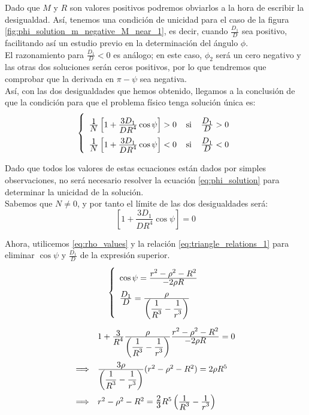 \documentclass[11pt]{book}
\newcommand\ddfrac[2]{\frac{\displaystyle #1}{\displaystyle #2}}
\begin{document}
Dado que $M$ y $R$ son valores positivos podremos obviarlos a la hora de escribir la desigualdad. Así, tenemos una condición de unicidad para el caso de la figura \ref{fig:phi_solution_m_negative_M_near_1}, es decir, cuando $\ddfrac{D_1}{D}$ sea positivo, facilitando así un estudio previo en la determinación del ángulo $\phi$.\\

El razonamiento para $\ddfrac{D_1}{D}<0$ es análogo; en este caso, $\phi_2$ será un cero negativo y las otras dos soluciones serán ceros positivos, por lo que tendremos que comprobar que la derivada en $\pi-\psi$ sea negativa.\\

Así, con las dos desigualdades que hemos obtenido, llegamos a la conclusión de que la condición para que el problema físico tenga solución única es:
\begin{align}
\left\{
\def\arraystretch{2}
\begin{array}{l}
	\ddfrac{1}{N}\left[1+\ddfrac{3D_1}{DR^4}\cos{\psi}\right]>0 \; \; \; \; \text{si} \; \; \; \; \ddfrac{D_1}{D}>0\\
	\ddfrac{1}{N}\left[1+\ddfrac{3D_1}{DR^4}\cos{\psi}\right]<0 \; \; \; \; \text{si} \; \; \; \; \ddfrac{D_1}{D}<0
\end{array}
\right.
\label{eq:condicion_unicidad}
\end{align}

Dado que todos los valores de estas ecuaciones están dados por simples observaciones, no será necesario resolver la ecuación \eqref{eq:phi_solution} para determinar la unicidad de la solución.\\

Sabemos que $N\neq0$, y por tanto el límite de las dos desigualdades será:
\[
\left[1+\ddfrac{3D_1}{DR^4}\cos{\psi}\right]=0
\]

Ahora, utilicemos \eqref{eq:rho_values} y la relación \eqref{eq:triangle_relations_1} para eliminar $\cos{\psi}$ y $\frac{D_1}{D}$ de la expresión superior.
\[
\left\{
\def\arraystretch{2}
\begin{array}{l}
	\cos{\psi}=\ddfrac{r^2-\rho^2-R^2}{-2\rho R}\\
	\ddfrac{D_1}{D}=\ddfrac{\rho}{\left(\ddfrac{1}{R^3}-\ddfrac{1}{r^3}\right)}
\end{array}
\right.
\]
\[
\def\arraystretch{2}
\begin{array}{ll}
& 1+\ddfrac{3}{R^4}\ddfrac{\rho}{\left(\ddfrac{1}{R^3}-\ddfrac{1}{r^3}\right)}\ddfrac{r^2-\rho^2-R^2}{-2\rho R}=0\\
\Longrightarrow & \ddfrac{3\rho}{\left(\ddfrac{1}{R^3}-\ddfrac{1}{r^3}\right)}(r^2-\rho^2-R^2)=2\rho R^5\\
\Longrightarrow & r^2-\rho^2-R^2=\ddfrac{2}{3}R^5\left(\ddfrac{1}{R^3}-\ddfrac{1}{r^3}\right)
\end{array}
\]
\end{document}
